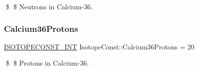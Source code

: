 \$ \$ Neutrons in Calcium-\/36. \mbox{\label{group___isotope_const-_calcium-_ca36_ga7dee8ef12be04bfc21b10ef9bf1f49a7}} 
\subsubsection{\texorpdfstring{Calcium36\+Protons}{Calcium36Protons}}
{\footnotesize\ttfamily \mbox{\hyperlink{group___isotope_const-_macros_ga5f18360b3e99483a35c32d789e62621c}{I\+S\+O\+T\+O\+P\+E\+C\+O\+N\+S\+T\+\_\+\+I\+NT}} Isotope\+Const\+::\+Calcium36\+Protons = 20}

\$ \$ Protons in Calcium-\/36. 